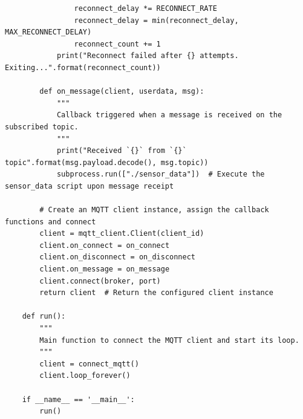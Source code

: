 \begin{verbatim}
                reconnect_delay *= RECONNECT_RATE
                reconnect_delay = min(reconnect_delay, MAX_RECONNECT_DELAY)
                reconnect_count += 1
            print("Reconnect failed after {} attempts. Exiting...".format(reconnect_count))

        def on_message(client, userdata, msg):
            """
            Callback triggered when a message is received on the subscribed topic.
            """
            print("Received `{}` from `{}` topic".format(msg.payload.decode(), msg.topic))
            subprocess.run(["./sensor_data"])  # Execute the sensor_data script upon message receipt

        # Create an MQTT client instance, assign the callback functions and connect
        client = mqtt_client.Client(client_id)
        client.on_connect = on_connect
        client.on_disconnect = on_disconnect
        client.on_message = on_message
        client.connect(broker, port)
        return client  # Return the configured client instance

    def run():
        """
        Main function to connect the MQTT client and start its loop.
        """
        client = connect_mqtt()
        client.loop_forever()

    if __name__ == '__main__':
        run()
\end{verbatim}

